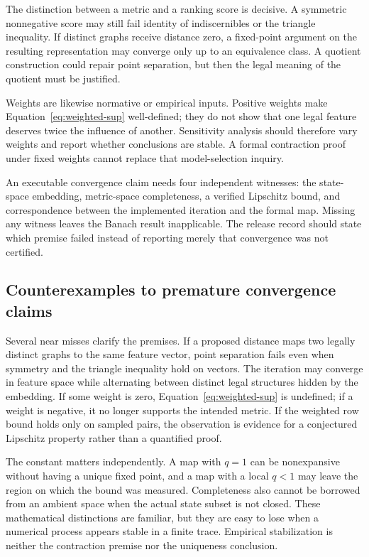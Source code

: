 The distinction between a metric and a ranking score is decisive. A symmetric nonnegative score may still fail identity of indiscernibles or the triangle inequality. If distinct graphs receive distance zero, a fixed-point argument on the resulting representation may converge only up to an equivalence class. A quotient construction could repair point separation, but then the legal meaning of the quotient must be justified.

Weights are likewise normative or empirical inputs. Positive weights make Equation~\eqref{eq:weighted-sup} well-defined; they do not show that one legal feature deserves twice the influence of another. Sensitivity analysis should therefore vary weights and report whether conclusions are stable. A formal contraction proof under fixed weights cannot replace that model-selection inquiry.

An executable convergence claim needs four independent witnesses: the state-space embedding, metric-space completeness, a verified Lipschitz bound, and correspondence between the implemented iteration and the formal map. Missing any witness leaves the Banach result inapplicable. The release record should state which premise failed instead of reporting merely that convergence was not certified.

\subsection{Counterexamples to premature convergence claims}

Several near misses clarify the premises. If a proposed distance maps two legally distinct graphs to the same feature vector, point separation fails even when symmetry and the triangle inequality hold on vectors. The iteration may converge in feature space while alternating between distinct legal structures hidden by the embedding. If some weight is zero, Equation~\eqref{eq:weighted-sup} is undefined; if a weight is negative, it no longer supports the intended metric. If the weighted row bound holds only on sampled pairs, the observation is evidence for a conjectured Lipschitz property rather than a quantified proof.

The constant matters independently. A map with $q=1$ can be nonexpansive without having a unique fixed point, and a map with a local $q<1$ may leave the region on which the bound was measured. Completeness also cannot be borrowed from an ambient space when the actual state subset is not closed. These mathematical distinctions are familiar, but they are easy to lose when a numerical process appears stable in a finite trace. Empirical stabilization is neither the contraction premise nor the uniqueness conclusion.

